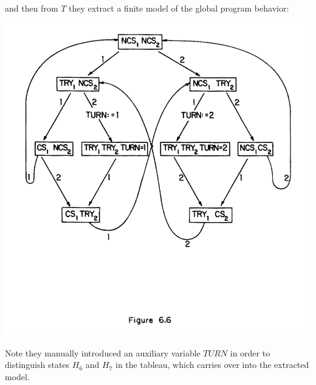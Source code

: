 \documentclass[10pt,a4paper]{article}
\begin{document}
and then from $T$ they extract a finite model of the global program behavior:
\begin{center}
    \includegraphics[scale=0.4]{images/mutex_model.png}
\end{center}
Note they manually introduced an auxiliary variable $TURN$ in order to distinguish states $H_6$ and $H_7$ in the tableau, which carries over into the extracted model. 
\end{document}
